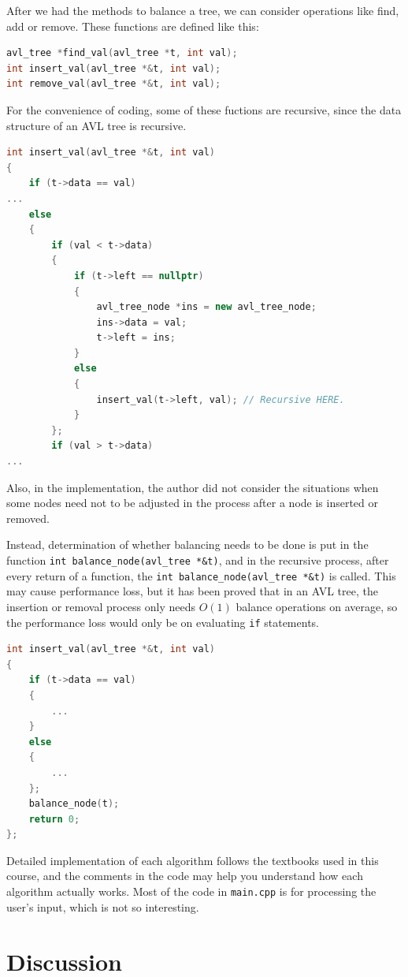\documentclass[cn,black,12pt,normal]{elegantnote}
\begin{document}
After we had the methods to balance a tree, we can consider operations like find, add or remove. These functions are defined like this:
\begin{lstlisting}[language = C++]
avl_tree *find_val(avl_tree *t, int val);
int insert_val(avl_tree *&t, int val);
int remove_val(avl_tree *&t, int val);
\end{lstlisting}
For the convenience of coding, some of these fuctions are recursive, since the data structure of an AVL tree is recursive.

\begin{lstlisting}[language = C++]
int insert_val(avl_tree *&t, int val)
{
	if (t->data == val)
...
	else
	{
		if (val < t->data)
		{
			if (t->left == nullptr)
			{
				avl_tree_node *ins = new avl_tree_node;
				ins->data = val;
				t->left = ins;
			}
			else
			{
				insert_val(t->left, val); // Recursive HERE.
			}
		};
		if (val > t->data)
...
\end{lstlisting}

Also, in the implementation, the author did not consider the situations when some nodes need not to be adjusted in the process after a node is inserted or removed. 

Instead, determination of whether balancing needs to be done is put in the function \lstinline{int balance_node(avl_tree *&t)}, and in the recursive process, after every return of a function, the \lstinline{int balance_node(avl_tree *&t)} is called. This may cause performance loss, but it has been proved that in an AVL tree, the insertion or removal process only needs $O(1)$ balance operations on average, so the performance loss would only be on evaluating \lstinline{if} statements.

\begin{lstlisting}[language = C++]
int insert_val(avl_tree *&t, int val)
{
	if (t->data == val)
	{
        ...
	}
	else
	{
        ...
	};
	balance_node(t);
	return 0;
};
\end{lstlisting}

Detailed implementation of each algorithm follows the textbooks used in this course, and the comments in the code may help you understand how each algorithm actually works. Most of the code in \lstinline{main.cpp} is for processing the user's input, which is not so interesting.

\section{Discussion}
\end{document}
